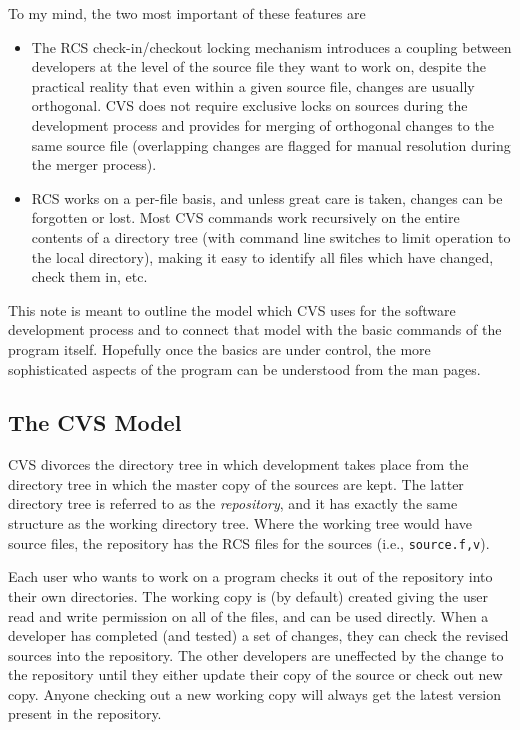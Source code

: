 To my mind, the two most important of these features are 
\begin{itemize}
\item The RCS check-in/checkout locking mechanism introduces a coupling
between developers at the level of the source file they want to work
on, despite the practical reality that even within a given source
file, changes are usually orthogonal.  CVS does not require exclusive
locks on sources during the development process and provides for
merging of orthogonal changes to the same source file (overlapping
changes are flagged for manual resolution during the merger process).

\item RCS works on a per-file basis, and unless great care is taken,
changes can be forgotten or lost.  Most CVS commands work recursively
on the entire contents of a directory tree (with command line switches
to limit operation to the local directory), making it easy to identify
all files which have changed, check them in, etc.
\end{itemize}
This note
is meant to outline the model which CVS uses for the software
development process and to connect that model with the basic commands
of the program itself.  Hopefully once the basics are under control,
the more sophisticated aspects of the program can be understood from
the man pages.

\subsection{The CVS Model}

CVS divorces the directory tree in which development takes place from
the directory tree in which the master copy of the sources are kept.
The latter directory tree is referred to as the {\em repository}, and
it has exactly the same structure as the working directory tree.  Where
the working tree would have source files, the repository has the RCS
files for the sources (i.e., {\tt source.f,v}).

Each user who wants to work on a program checks it out of the
repository into their own directories.  The working copy is (by
default) created giving the user read and write permission on all of
the files, and can be used directly.  When a developer has completed
(and tested) a set of changes, they can check the revised sources into
the repository.  The other developers are uneffected by the change to
the repository until they either update their copy of the source or
check out new copy.  Anyone checking out a new working copy will
always get the latest version present in the repository.

